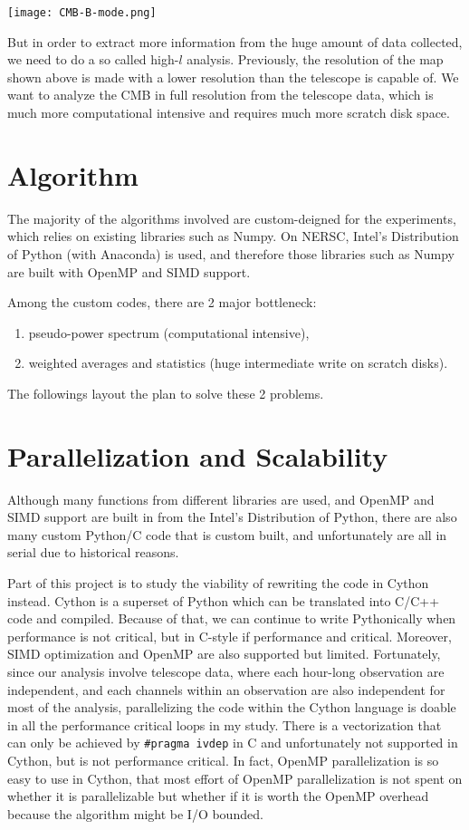 \documentclass[12pt,english,letterpaper,article]{memoir}
\providecommand{\tightlist}{%
  \setlength{\itemsep}{0pt}\setlength{\parskip}{0pt}}
\begin{document}
\texttt{[image: CMB-B-mode.png]}~

But in order to extract more information from the huge amount of data
collected, we need to do a so called high-\(l\) analysis. Previously,
the resolution of the map shown above is made with a lower resolution
than the telescope is capable of. We want to analyze the CMB in full
resolution from the telescope data, which is much more computational
intensive and requires much more scratch disk space.

\chapter{Algorithm}\label{algorithm}

The majority of the algorithms involved are custom-deigned for the
experiments, which relies on existing libraries such as Numpy. On NERSC,
Intel's Distribution of Python (with Anaconda) is used, and therefore
those libraries such as Numpy are built with OpenMP and SIMD support.

Among the custom codes, there are 2 major bottleneck:

\begin{enumerate}
\tightlist
\item
  pseudo-power spectrum (computational intensive),
\item
  weighted averages and statistics (huge intermediate write on scratch
  disks).
\end{enumerate}

The followings layout the plan to solve these 2 problems.

\chapter{Parallelization and
Scalability}\label{parallelization-and-scalability}

Although many functions from different libraries are used, and OpenMP
and SIMD support are built in from the Intel's Distribution of Python,
there are also many custom Python/C code that is custom built, and
unfortunately are all in serial due to historical reasons.

Part of this project is to study the viability of rewriting the code in
Cython instead. Cython is a superset of Python which can be translated
into C/C++ code and compiled. Because of that, we can continue to write
Pythonically when performance is not critical, but in C-style if
performance and critical. Moreover, SIMD optimization and OpenMP are
also supported but limited. Fortunately, since our analysis involve
telescope data, where each hour-long observation are independent, and
each channels within an observation are also independent for most of the
analysis, parallelizing the code within the Cython language is doable in
all the performance critical loops in my study. There is a vectorization
that can only be achieved by \texttt{\#pragma\ ivdep} in C and
unfortunately not supported in Cython, but is not performance critical.
In fact, OpenMP parallelization is so easy to use in Cython, that most
effort of OpenMP parallelization is not spent on whether it is
parallelizable but whether if it is worth the OpenMP overhead because
the algorithm might be I/O bounded.
\end{document}

